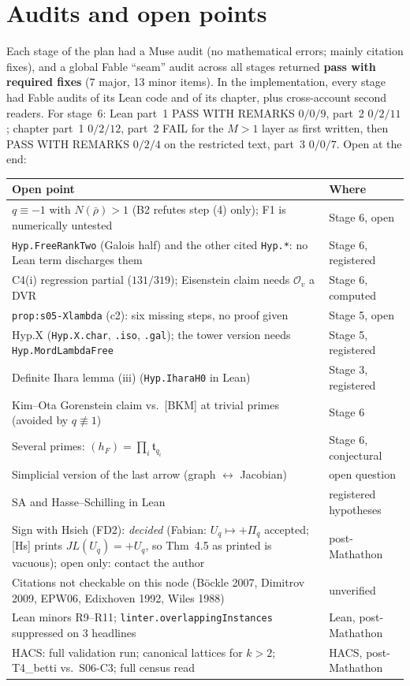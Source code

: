 \documentclass[11pt,a4paper]{article}
\newcommand{\cO}{\mathcal{O}}
\newcommand{\tq}{\mathfrak{t}}
\newcommand{\HypX}{\mathrm{Hyp.X}}
\begin{document}
\section*{Audits and open points}

Each stage of the plan had a Muse audit (no mathematical errors; mainly citation fixes), and a global Fable ``seam''
audit across all stages returned \textbf{pass with required fixes} (7 major, 13 minor items). In the implementation,
every stage had Fable audits of its Lean code and of its chapter, plus cross-account second readers. For stage~6: Lean
part~1 PASS WITH REMARKS $0/0/9$, part~2 $0/2/11$; chapter part~1 $0/2/12$, part~2 FAIL for the $M>1$ layer as
first written, then PASS WITH REMARKS $0/2/4$ on the restricted text, part~3 $0/0/7$. Open at the end:

\begin{center}
\small
\begin{tabular}{>{\raggedright\arraybackslash}p{}l}
\toprule
\textbf{Open point} & \textbf{Where}\\
\midrule
$q\equiv-1$ with $N(\bar\rho)>1$ (B2 refutes step (4) only); F1 is numerically untested & Stage 6, open\\
\texttt{Hyp.FreeRankTwo} (Galois half) and the other cited \texttt{Hyp.*}: no Lean term discharges them & Stage 6, registered\\
C4(i) regression partial ($131/319$); Eisenstein claim needs $\cO_v$ a DVR & Stage 6, computed\\
\texttt{prop:s05-Xlambda} (c2): six missing steps, no proof given & Stage 5, open\\
$\HypX$ (\texttt{Hyp.X.char}, \texttt{.iso}, \texttt{.gal}); the tower version needs \texttt{Hyp.MordLambdaFree} & Stage 5, registered\\
Definite Ihara lemma (iii) (\texttt{Hyp.IharaH0} in Lean) & Stage 3, registered\\
Kim--Ota Gorenstein claim vs.\ [BKM] at trivial primes (avoided by $q\not\equiv1$) & Stage 6\\
Several primes: $(h_F)=\prod_i\tq_{q_i}$ & Stage 6, conjectural\\
Simplicial version of the last arrow (graph $\leftrightarrow$ Jacobian) & open question\\
SA and Hasse--Schilling in Lean & registered hypotheses\\
Sign with Hsieh (FD2): \emph{decided} (Fabian: $U_q\mapsto+\Pi_q$ accepted; [Hs] prints $JL(U_q)=+U_q$, so Thm~4.5 as printed is vacuous); open only: contact the author & post-Mathathon\\
Citations not checkable on this node (B\"ockle 2007, Dimitrov 2009, EPW06, Edixhoven 1992, Wiles 1988) & unverified\\
Lean minors R9--R11; \texttt{linter.overlappingInstances} suppressed on 3 headlines & Lean, post-Mathathon\\
HACS: full validation run; canonical lattices for $k>2$; T4\_betti vs.\ S06-C3; full census read & HACS, post-Mathathon\\
\bottomrule
\end{tabular}
\end{center}
\end{document}
